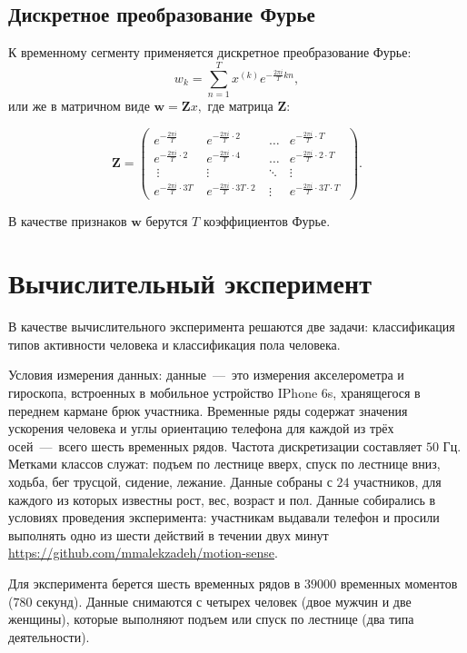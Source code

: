 \documentclass[12pt, twoside]{article}
\begin{document}
\subsection{ Дискретное преобразование Фурье}
К временному сегменту применяется дискретное преобразование Фурье:
$$w_k = \sum\limits_{n=1}^{T}x^{(k)}e^{-\frac{2\pi i}{T}kn},$$
или же в матричном виде $\mathbf{w} = \mathbf{Z}x,$ где матрица $\mathbf{Z}$:

\begin{equation*}
\mathbf{Z} = \left(
\begin{array}{cccc}
e^{-\frac{2\pi i}{T}} & e^{-\frac{2\pi i}{T}\cdot 2} & \ldots & e^{-\frac{2\pi i}{T}\cdot T}\\
e^{-\frac{2\pi i}{T}\cdot 2}\ & e^{-\frac{2\pi i}{T}\cdot 4}\ & \ldots & e^{-\frac{2\pi i}{T}\cdot 2\cdot T}\\\
\vdots & \vdots & \ddots & \vdots\\
e^{-\frac{2\pi i}{T}\cdot 3T}\ & e^{-\frac{2\pi i}{T}\cdot 3T\cdot 2}\ & \vdots & e^{-\frac{2\pi i}{T}\cdot 3T\cdot T}\
\end{array}
\right).
\end{equation*}

В качестве признаков $\mathbf{w}$ берутся $T$ коэффициентов Фурье.


\section{Вычислительный эксперимент}

В качестве вычислительного эксперимента решаются две задачи:  классификация типов активности человека и классификация пола человека. 

Условия измерения данных: данные~---~это измерения акселерометра и гироскопа, встроенных в мобильное устройство IPhone 6s, хранящегося в переднем кармане брюк участника. Временные ряды содержат значения ускорения человека и углы ориентацию телефона для каждой из трёх осей~---~всего шесть временных рядов. Частота дискретизации составляет $50$ Гц. Метками классов служат: подъем по лестнице вверх, спуск по лестнице вниз, ходьба, бег трусцой, сидение, лежание. Данные собраны с $24$ участников, для каждого из  которых известны рост, вес, возраст и пол. Данные собирались в условиях проведения эксперимента: участникам выдавали телефон и просили выполнять одно из шести действий в течении двух минут \url{https://github.com/mmalekzadeh/motion-sense}.

Для эксперимента берется шесть временных рядов в $39000$ временных моментов ($780$ секунд). Данные снимаются с четырех человек (двое мужчин и две женщины), которые выполняют подъем или спуск по лестнице (два типа деятельности).
\end{document}
